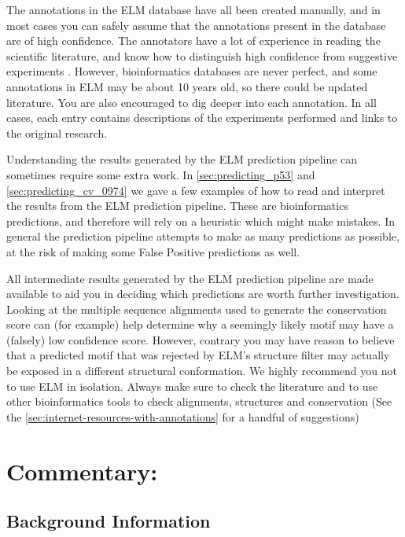 \documentclass[12pt]{article}
\begin{document}
The annotations in the ELM database have all been created manually, and in most cases
you can safely assume that the annotations present in the database are of
high confidence.
The annotators have a lot of experience in reading the scientific literature,
and know how to distinguish high confidence from suggestive experiments
\cite{26581338}.
However, bioinformatics databases are never perfect, and some annotations in
ELM may be about 10 years old, so there could be updated literature.
You are also encouraged to dig deeper into each annotation.
In all cases, each entry contains descriptions of the experiments performed and
links to the original research.

Understanding the results generated by the ELM prediction pipeline
can sometimes require some extra work.
In \ref{sec:predicting_p53} and \ref{sec:predicting_cv_0974} we gave a few
examples of how to read and interpret the results from the ELM prediction
pipeline.
These are bioinformatics predictions, and therefore will rely
on a heuristic which might make mistakes.
In general the  prediction pipeline attempts to make as many predictions as
possible, at the risk of making some False Positive predictions as well.

All intermediate results generated by the ELM prediction
pipeline are made available to aid you in deciding which predictions are worth
further investigation.
Looking at the multiple sequence alignments used to generate the conservation
score can (for example) help determine why a seemingly likely motif may have a
(falsely) low confidence score.
However, contrary you may have reason to believe that a predicted motif that was
rejected by ELM's structure filter may actually be exposed in a different
structural conformation.
We highly recommend you not to use ELM in isolation. Always make sure to check
the literature and to use other bioinformatics tools to check alignments, structures and conservation (See the \ref{sec:internet-resources-with-annotations} for a handful of suggestions)

\section*{Commentary:}\label{commentary}

\subsection*{Background Information}\label{background-information}
\end{document}
